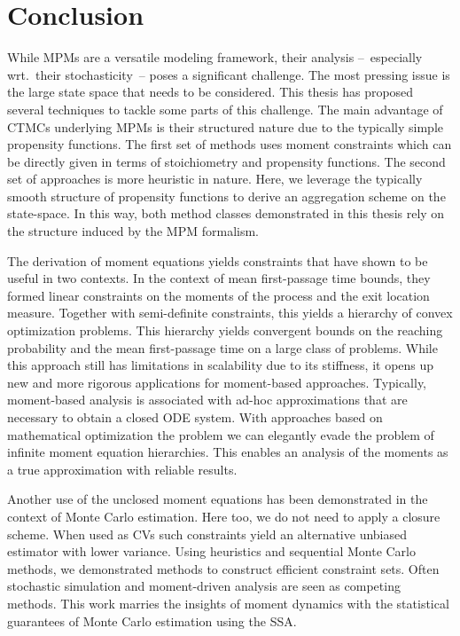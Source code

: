 \chapter{Conclusion}
While \aclp{MPM} are a versatile modeling framework, their analysis
--~especially wrt.\ their stochasticity~-- poses a significant challenge.
The most pressing issue is the large state space that needs to be considered.
This thesis has proposed several techniques to tackle some parts of
this challenge.
The main advantage of \acp{CTMC} underlying \acp{MPM} is their
structured nature due to the typically simple propensity functions.
The first set of methods uses moment constraints which can be
directly given in terms of stoichiometry and propensity functions.
The second set of approaches is more heuristic in nature.
Here, we leverage the typically smooth structure of propensity
functions to derive an aggregation scheme on the state-space.
In this way, both method classes demonstrated in this thesis rely on
the structure induced by the \ac{MPM} formalism.

The derivation of moment equations yields constraints that have shown
to be useful in two contexts.
In the context of mean first-passage time bounds, they formed linear
constraints on the moments of the process and the exit location measure.
Together with semi-definite constraints, this yields a hierarchy of
convex optimization problems.
This hierarchy yields convergent bounds on the reaching probability
and the mean first-passage time on a large class of problems.
While this approach still has limitations in scalability due to its
stiffness, it opens up new and more rigorous applications for
moment-based approaches.
Typically, moment-based analysis is associated with ad-hoc
approximations that are necessary to obtain a closed \ac{ODE} system.
With approaches based on mathematical optimization the problem we can
elegantly evade the problem of infinite moment equation hierarchies.
This enables an analysis of the moments as a true approximation with
reliable results.

Another use of the unclosed moment equations has been demonstrated in
the context of Monte Carlo estimation.
Here too, we do not need to apply a closure scheme.
When used as \aclp{CV} such constraints yield an alternative unbiased
estimator with lower variance.
Using heuristics and sequential Monte Carlo methods, we demonstrated
methods to construct efficient constraint sets.
Often stochastic simulation and moment-driven analysis are seen as
competing methods.
This work marries the insights of moment dynamics with the
statistical guarantees of Monte Carlo estimation using the \ac{SSA}.

